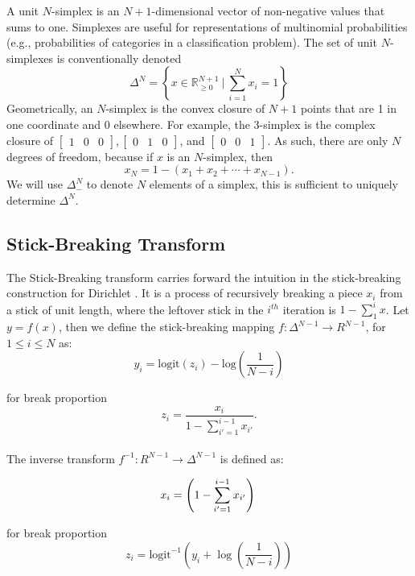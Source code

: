\documentclass[11pt]{article}
\newcommand{\setcomp}[2]{\left\{ #1 \ \Big|\ #2 \right\}}
\begin{document}
A unit $N$-simplex is an $N + 1$-dimensional vector of non-negative
values that sums to one.  Simplexes are useful for representations of multinomial probabilities
(e.g., probabilities of categories in a classification problem). The set of unit $N$-simplexes is conventionally denoted
\[
  \Delta^N = \setcomp{x \in \mathbb{R}_{\ge 0}^{N + 1}}{ \sum_{i=1}^{N} x_i = 1}
\]
Geometrically, an $N$-simplex is the convex closure of $N+1$ points
that are 1 in one coordinate and 0 elsewhere.  For example, the
3-simplex is the complex closure of
$\begin{bmatrix}1 & 0 & 0 \end{bmatrix},
\begin{bmatrix} 0 & 1 & 0 \end{bmatrix}$,
and $\begin{bmatrix} 0 & 0 & 1 \end{bmatrix}$. As such, there are only $N$ degrees of
freedom, because if $x$ is an $N$-simplex, then
\[
  x_N = 1 - (x_1 + x_2 + \cdots + x_{N-1}).
\]
We will use $\Delta^N_-$ to denote $N$ elements of a simplex, this is sufficient to uniquely determine $\Delta^N$.
\subsection{Stick-Breaking Transform}

The Stick-Breaking transform carries forward the intuition in the stick-breaking construction for Dirichlet \cite{sethuraman1994constructive}. It is a process of recursively breaking a piece $x_i$ from a stick of unit length, where the leftover stick in the $i^{th}$ iteration is $ 1 - \sum_{1}^{i}x$. Let $y = f(x)$, then we define the stick-breaking mapping $ f \colon \Delta^{N-1} \to  R^{N-1}$, for $1 \leq i \leq N$ as:	
\[
y_i
= \mathrm{logit}(z_i) - \mbox{log}\left(\frac{1}{N-i}
   \right) 
   \]
  
for break proportion 
\[ 
 z_i = \frac{x_i}{1 - \sum_{i' = 1}^{i-1} x_{i'}}.
\]\\

The inverse transform $ f^{-1} \colon R^{N-1} \to \Delta^{N-1}$ is defined as:

\[
x_i = \left( 1 - \sum_{i'=1}^{i-1} x_{i'} \right)\\
\]

for break proportion \[z_i = \mathrm{logit}^{-1} \left( y_i  + \log \left( \frac{1}{N - i}
                                            \right)\right)
                                            \]\\
                                            
\end{document}
